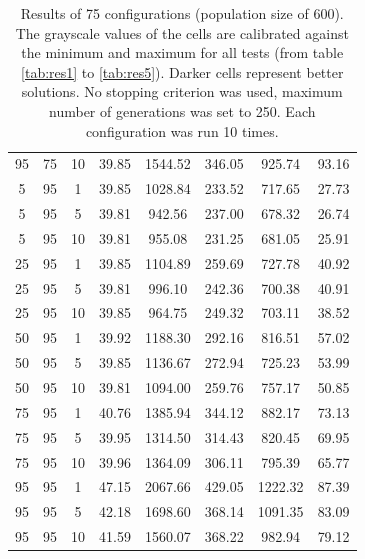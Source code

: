 \begin{table}[H]
\begin{tabular}{ccc|c|c|c|c|c}
95 & 75 & 10 & \cellcolor{gray!50}39.85 & \cellcolor{gray!1}1544.52 & \cellcolor{gray!1}346.05 & \cellcolor{gray!1}925.74 & 93.16\\
5 & 95 & 1 & \cellcolor{gray!50}39.85 & \cellcolor{gray!1}1028.84 & \cellcolor{gray!1}233.52 & \cellcolor{gray!33}717.65 & 27.73\\
5 & 95 & 5 & \cellcolor{gray!50}39.81 & \cellcolor{gray!14}942.56 & \cellcolor{gray!1}237.00 & \cellcolor{gray!45}678.32 & 26.74\\
5 & 95 & 10 & \cellcolor{gray!50}39.81 & \cellcolor{gray!12}955.08 & \cellcolor{gray!1}231.25 & \cellcolor{gray!44}681.05 & 25.91\\
25 & 95 & 1 & \cellcolor{gray!50}39.85 & \cellcolor{gray!1}1104.89 & \cellcolor{gray!1}259.69 & \cellcolor{gray!30}727.78 & 40.92\\
25 & 95 & 5 & \cellcolor{gray!50}39.81 & \cellcolor{gray!5}996.10 & \cellcolor{gray!1}242.36 & \cellcolor{gray!38}700.38 & 40.91\\
25 & 95 & 10 & \cellcolor{gray!50}39.85 & \cellcolor{gray!11}964.75 & \cellcolor{gray!1}249.32 & \cellcolor{gray!37}703.11 & 38.52\\
50 & 95 & 1 & \cellcolor{gray!49}39.92 & \cellcolor{gray!1}1188.30 & \cellcolor{gray!1}292.16 & \cellcolor{gray!2}816.51 & 57.02\\
50 & 95 & 5 & \cellcolor{gray!50}39.85 & \cellcolor{gray!1}1136.67 & \cellcolor{gray!1}272.94 & \cellcolor{gray!30}725.23 & 53.99\\
50 & 95 & 10 & \cellcolor{gray!50}39.81 & \cellcolor{gray!1}1094.00 & \cellcolor{gray!1}259.76 & \cellcolor{gray!21}757.17 & 50.85\\
75 & 95 & 1 & \cellcolor{gray!41}40.76 & \cellcolor{gray!1}1385.94 & \cellcolor{gray!1}344.12 & \cellcolor{gray!1}882.17 & 73.13\\
75 & 95 & 5 & \cellcolor{gray!49}39.95 & \cellcolor{gray!1}1314.50 & \cellcolor{gray!1}314.43 & \cellcolor{gray!1}820.45 & 69.95\\
75 & 95 & 10 & \cellcolor{gray!49}39.96 & \cellcolor{gray!1}1364.09 & \cellcolor{gray!1}306.11 & \cellcolor{gray!9}795.39 & 65.77\\
95 & 95 & 1 & \cellcolor{gray!1}47.15 & \cellcolor{gray!1}2067.66 & \cellcolor{gray!1}429.05 & \cellcolor{gray!1}1222.32 & 87.39\\
95 & 95 & 5 & \cellcolor{gray!26}42.18 & \cellcolor{gray!1}1698.60 & \cellcolor{gray!1}368.14 & \cellcolor{gray!1}1091.35 & 83.09\\
95 & 95 & 10 & \cellcolor{gray!33}41.59 & \cellcolor{gray!1}1560.07 & \cellcolor{gray!1}368.22 & \cellcolor{gray!1}982.94 & 79.12
\end{tabular}
\caption{Results of 75 configurations (population size of 600). The grayscale values of the cells are calibrated against the minimum and maximum for all tests (from table \ref{tab:res1} to \ref{tab:res5}). Darker cells represent better solutions. No stopping criterion was used, maximum number of generations was set to 250. Each configuration was run 10 times.}
\label{tab:res3}
\end{table}

